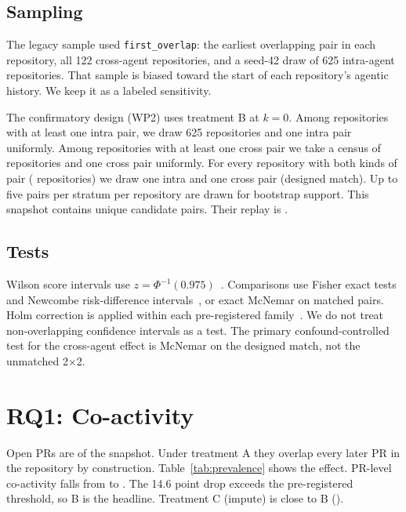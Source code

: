 \documentclass[10pt,conference]{IEEEtran}
\begin{document}
\subsection{Sampling}
The legacy sample used \texttt{first\_overlap}: the earliest overlapping pair in each repository, all 122 cross-agent repositories, and a seed-42 draw of 625 intra-agent repositories. That sample is biased toward the start of each repository's agentic history. We keep it as a labeled sensitivity.

The confirmatory design (WP2) uses treatment B at $k{=}0$. Among repositories with at least one intra pair, we draw 625 repositories and one intra pair uniformly. Among repositories with at least one cross pair we take a census of repositories and one cross pair uniformly. For every repository with both kinds of pair (\NReposMatched{} repositories) we draw one intra and one cross pair (designed match). Up to five pairs per stratum per repository are drawn for bootstrap support. This snapshot contains \NReplayCandidates{} unique candidate pairs. Their replay is \WPThreeStatus.

\subsection{Tests}
Wilson score intervals use $z=\Phi^{-1}(0.975)$~\cite{wilson1927}. Comparisons use Fisher exact tests and Newcombe risk-difference intervals~\cite{newcombe1998}, or exact McNemar on matched pairs. Holm correction is applied within each pre-registered family~\cite{holm1979}. We do not treat non-overlapping confidence intervals as a test. The primary confound-controlled test for the cross-agent effect is McNemar on the designed match, not the unmatched 2$\times$2.

\section{RQ1: Co-activity}
\label{sec:rq1}



Open PRs are \OpenShare{} of the snapshot. Under treatment A they overlap every later PR in the repository by construction. Table~\ref{tab:prevalence} shows the effect. PR-level co-activity falls from \PrShareA{} to \PrShareB. The 14.6 point drop exceeds the pre-registered threshold, so B is the headline. Treatment C (impute) is close to B (\PrShareC).


\end{document}
